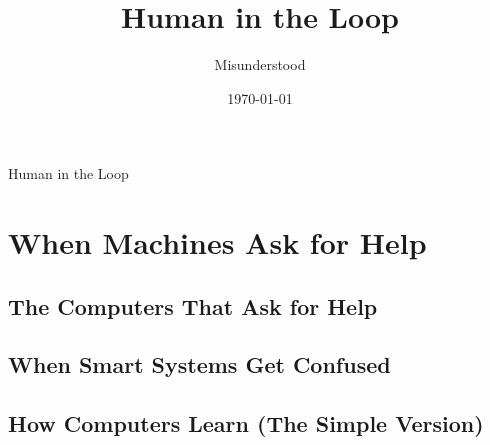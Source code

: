 \documentclass[
11pt,                    %
twoside,                 %
openright,               %
headinclude,             %
footinclude=false,       %
BCOR=12mm,               %
DIV=12,                  %
numbers=noenddot,        %
bibliography=totoc,      %
listof=totoc,            %
]{scrbook}
\title{Human in the Loop}
\subtitle{Misunderstood}
\author{\bookauthor}
\date{\today}
\begin{document}
	
	\frontmatter
	
	\thispagestyle{empty}
	\begin{center}
		{\huge Human in the Loop}
	\end{center}
	\cleardoublepage
	
	\thispagestyle{empty}
	
	\cleardoublepage
	
	\thispagestyle{empty}
	
	\cleardoublepage
	
	\tableofcontents
	\cleardoublepage
	
	
	
	
	\mainmatter
	
	\part{When Machines Ask for Help}

	\chapter{The Computers That Ask for Help}
	\label{ch:computers-ask}
	
	

	\chapter{When Smart Systems Get Confused}
	\label{ch:confused}
	
	

	\chapter{How Computers Learn (The Simple Version)}
	\label{ch:learning}
	
	
\end{document}

